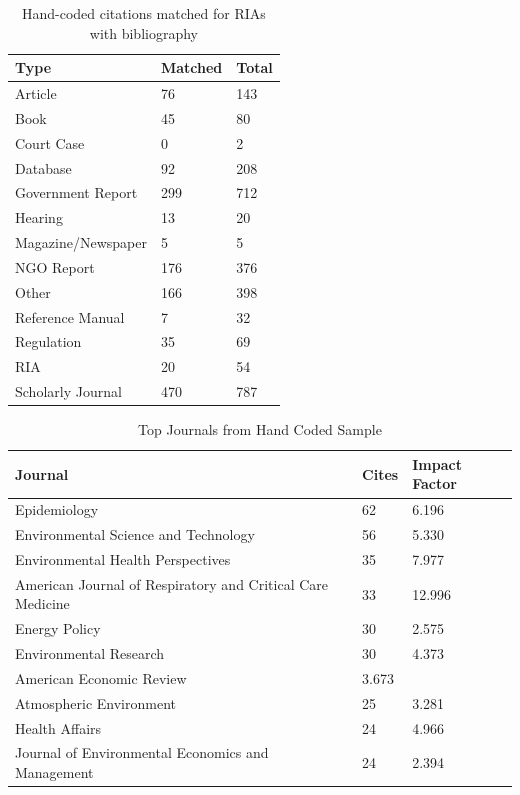 \documentclass[12pt]{article}
\begin{document}
\begin{table}[ht]
\centering
\caption{Hand-coded citations matched for RIAs with bibliography}\label{tab:bibtypes}
\begin{tabular}{lll}
  \hline
  \hline
 Type & Matched & Total\\
 \hline
Article & 76 & 143 \\
Book & 45 & 80\\
Court Case & 0 & 2\\
Database & 92 & 208 \\
Government Report & 299 & 712 \\
Hearing & 13 & 20\\
Magazine/Newspaper & 5 & 5\\
NGO Report & 176 & 376 \\
Other & 166 & 398 \\
Reference Manual & 7 &  32\\
Regulation & 35 & 69 \\
RIA & 20 & 54\\
Scholarly Journal & 470 & 787\\
  \hline
  \hline
\end{tabular}
\end{table}

\begin{table}[ht]
\centering
\caption{Top Journals from Hand Coded Sample}\label{tab:allimpact}
\begin{tabular}{lll}
  \hline
  \hline
 Journal & Cites & Impact Factor\\
 \hline
Epidemiology & 62 & 6.196\\
Environmental Science and Technology & 56 & 5.330 \\
Environmental Health Perspectives & 35 & 7.977\\
American Journal of Respiratory and Critical Care Medicine & 33 & 12.996\\
Energy Policy & 30 & 2.575\\
Environmental Research & 30 & 4.373\\ 
American Economic Review & 3.673\\
Atmospheric Environment & 25 & 3.281\\
Health Affairs & 24 & 4.966\\
Journal of Environmental Economics and Management & 24 & 2.394\\
  \hline
  \hline
\end{tabular}
\end{table}
\end{document}
